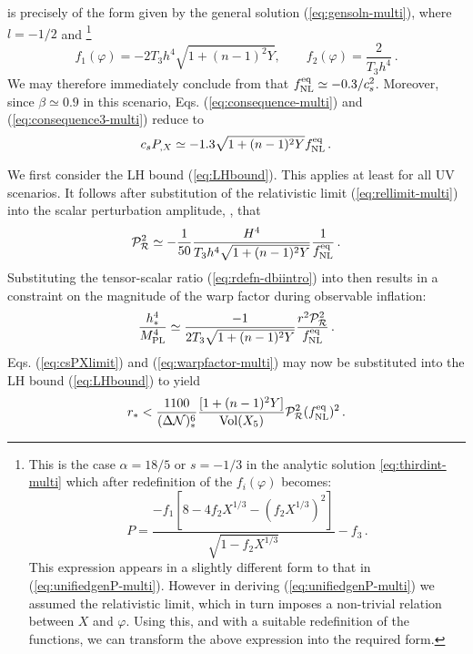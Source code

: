  is precisely of the form given by the 
general solution (\ref{eq:gensoln-multi}), where $l=-1/2$ and
\footnote{This is the case $\alpha =18/5$ or $s=-1/3$ in the analytic solution
\eqref{eq:thirdint-multi} which after redefinition of the $f_i (\varphi)$
becomes:
% 
\begin{equation}
P = \frac{-f_1\left[8 - 4f_2X^{1/3}
-\left(f_2X^{1/3}\right)^2\right]}{\sqrt{1-f_2X^{1/3}}} -f_3 \, .
\end{equation}
% 
This expression appears in a slightly different 
form to that in (\ref{eq:unifiedgenP-multi}). 
However in deriving (\ref{eq:unifiedgenP-multi}) we assumed the
relativistic limit, which in turn imposes a non-trivial 
relation between $X$ and $\varphi$. Using this, and with a 
suitable redefinition of the functions, we can
transform the above expression into the required form.} 
% 
\begin{equation}
\label{eq:fdefns-multi}
f_1 (\varphi) = -2T_3 h^4 \sqrt{1+(n-1)^2Y} , \qquad 
f_2 (\varphi) = \frac{2}{T_3 h^4} \,.
\end{equation}
% 
We may therefore immediately conclude from  that
$f_{\mathrm{NL}}^{\mathrm{eq}}
\simeq -0.3/c_s^2$. Moreover, since $\beta \simeq 0.9$ in this scenario, 
Eqs. (\ref{eq:consequence-multi}) and (\ref{eq:consequence3-multi}) reduce to  
% 
\begin{equation}
\label{eq:csPXlimit}
c_sP_{,X} \simeq -1.3 \sqrt{1+(n-1)^2Y} f_{\mathrm{NL}}^{\mathrm{eq}} \,.
\end{equation}
% 


We first consider the LH bound (\ref{eq:LHbound}). This applies at least for all
UV scenarios. It follows after substitution of the relativistic limit
(\ref{eq:rellimit-multi}) into the scalar perturbation amplitude,
,
that 
% 
\begin{equation}
\label{eq:usefulPs-multi}
\mathcal{P}_{\mathcal{R}}^2  \simeq -\frac{1}{50} \frac{H^4}{T_3 h^4\sqrt{1+(n-1)^2Y}}
\frac{1}{f_{\mathrm{NL}}^{\mathrm{eq}}}\,.
\end{equation}
% 
Substituting the tensor-scalar ratio (\ref{eq:rdefn-dbiintro}) into  
 then results in a constraint on the magnitude of 
the warp factor during observable inflation:
%  
\begin{equation}
\label{eq:warpfactor-multi}
\frac{h^4_*}{M_{\mathrm{PL}}^4} \simeq \frac{-1}{2 T_3 \sqrt{1+(n-1)^2Y}} 
\frac{r^2 \mathcal{P}_{\mathcal{R}}^2 }{f_{\mathrm{NL}}^{\mathrm{eq}}} \,.
\end{equation}
% 
Eqs. (\ref{eq:csPXlimit}) and (\ref{eq:warpfactor-multi}) may now be substituted into 
the LH bound (\ref{eq:LHbound}) to yield
%  
\begin{equation}
\label{eq:actualLH-multi}
r_* < \frac{1100}{(\Delta \mathcal{N} )_*^6} 
\frac{[1+(n-1)^2Y]}{\mathrm{Vol} (X_5)} \mathcal{P}_{\mathcal{R}}^2  (f_{\mathrm{NL}}^{\mathrm{eq}})^2 \,.
\end{equation}
% 


